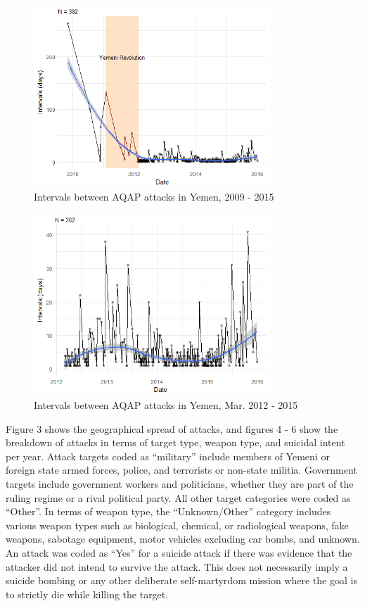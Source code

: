 \documentclass[letterpaper,12pt]{article}
\theoremstyle{definition}
\begin{document}
\begin{figure}[htb!]
\begin{center}
\caption {Intervals between AQAP attacks in Yemen, 2009 - 2015}
  \includegraphics[width=3.5in]{intervals2009.png}
\end{center}
\end{figure}
\begin{figure}[htb!]
\begin{center}
\caption {Intervals between AQAP attacks in Yemen, Mar. 2012 - 2015}
  \includegraphics[width=3.5in]{intervals2012.png}
\end{center}
\end{figure}

Figure 3 shows the geographical spread of attacks, and figures 4 - 6 show the breakdown of attacks in terms of target type, weapon type, and suicidal intent per year. Attack targets coded as ``military'' include members of Yemeni or foreign state armed forces, police, and terrorists or non-state militia. Government targets include government workers and politicians, whether they are part of the ruling regime or a rival political party. All other target categories were coded as ``Other''. In terms of weapon type, the ``Unknown/Other'' category includes various weapon types such as biological, chemical, or radiological weapons, fake weapons, sabotage equipment, motor vehicles excluding car bombs, and unknown. An attack was coded as ``Yes'' for a suicide attack if there was evidence that the attacker did not intend to survive the attack. This does not necessarily imply a suicide bombing or any other deliberate self-martyrdom mission where the goal is to strictly die while killing the target.
\end{document}

